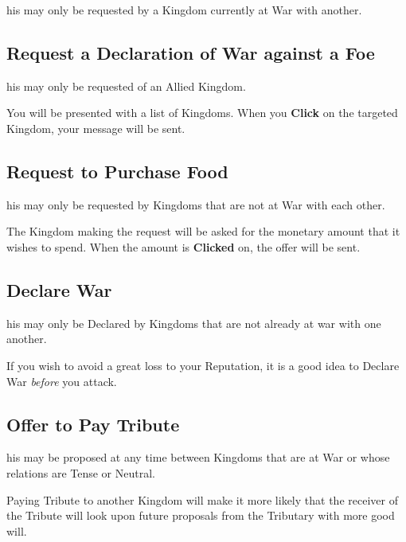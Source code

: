 his may only be requested by a Kingdom currently at War with another.

\subsection{Request a Declaration of War against a Foe}


his may only be requested of an Allied Kingdom.

You will be presented with a list of Kingdoms. When you \textbf{Click} on the targeted Kingdom, your message will be sent.

\subsection{Request to Purchase Food}


his may only be requested by Kingdoms that are not at War with each other.

The Kingdom making the request will be asked for the monetary amount that it wishes to spend. When the amount is \textbf{Clicked} on, the offer will be sent.

\subsection{Declare War}


his may only be Declared by Kingdoms that are not already at war with one another.

If you wish to avoid a great loss to your Reputation, it is a good idea to Declare War \textit{before} you attack.

\subsection{Offer to Pay Tribute}


his may be proposed at any time between Kingdoms that are at War or whose relations are Tense or Neutral.

Paying Tribute to another Kingdom will make it more likely that the receiver of the Tribute will look upon future proposals from the Tributary with more good will.


